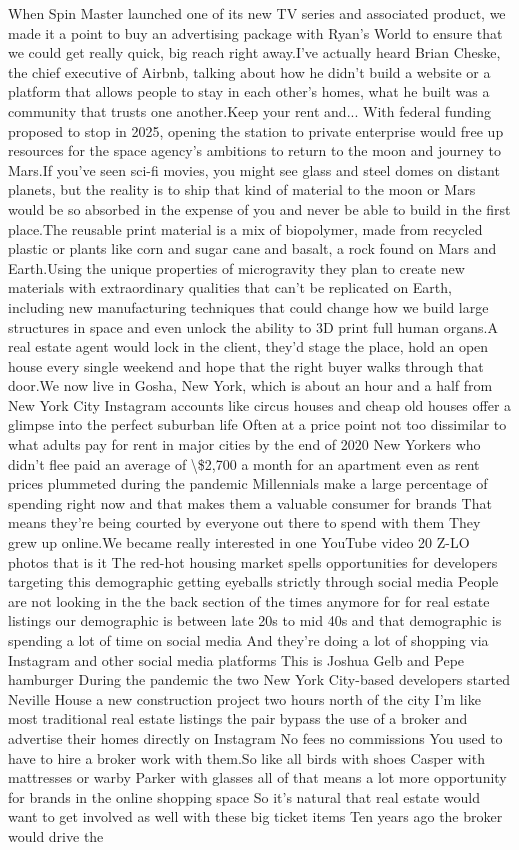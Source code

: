 \documentclass{article}%
\begin{document}
When Spin Master launched one of its new TV series and associated product, we made it a point to buy an advertising package with Ryan's World to ensure that we could get really quick, big reach right away.I've actually heard Brian Cheske, the chief executive of Airbnb, talking about how he didn't build a website or a platform that allows people to stay in each other's homes, what he built was a community that trusts one another.Keep your rent and... With federal funding proposed to stop in 2025, opening the station to private enterprise would free up resources for the space agency's ambitions to return to the moon and journey to Mars.If you've seen sci{-}fi movies, you might see glass and steel domes on distant planets, but the reality is to ship that kind of material to the moon or Mars would be so absorbed in the expense of you and never be able to build in the first place.The reusable print material is a mix of biopolymer, made from recycled plastic or plants like corn and sugar cane and basalt, a rock found on Mars and Earth.Using the unique properties of microgravity they plan to create new materials with extraordinary qualities that can't be replicated on Earth, including new manufacturing techniques that could change how we build large structures in space and even unlock the ability to 3D print full human organs.A real estate agent would lock in the client, they'd stage the place, hold an open house every single weekend and hope that the right buyer walks through that door.We now live in Gosha, New York, which is about an hour and a half from New York City Instagram accounts like circus houses and cheap old houses offer a glimpse into the perfect suburban life Often at a price point not too dissimilar to what adults pay for rent in major cities by the end of 2020 New Yorkers who didn't flee paid an average of \textbackslash{}\$2,700 a month for an apartment even as rent prices plummeted during the pandemic Millennials make a large percentage of spending right now and that makes them a valuable consumer for brands That means they're being courted by everyone out there to spend with them They grew up online.We became really interested in one YouTube video 20 Z{-}LO photos that is it The red{-}hot housing market spells opportunities for developers targeting this demographic getting eyeballs strictly through social media People are not looking in the the back section of the times anymore for for real estate listings our demographic is between late 20s to mid 40s and that demographic is spending a lot of time on social media And they're doing a lot of shopping via Instagram and other social media platforms This is Joshua Gelb and Pepe hamburger During the pandemic the two New York City{-}based developers started Neville House a new construction project two hours north of the city I'm like most traditional real estate listings the pair bypass the use of a broker and advertise their homes directly on Instagram No fees no commissions You used to have to hire a broker work with them.So like all birds with shoes Casper with mattresses or warby Parker with glasses all of that means a lot more opportunity for brands in the online shopping space So it's natural that real estate would want to get involved as well with these big ticket items Ten years ago the broker would drive the 
\end{document}
